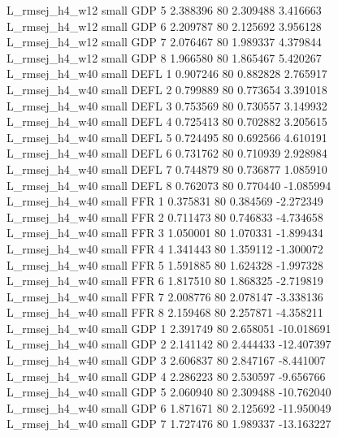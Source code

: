 L_rmsej_h4_w12      small      GDP                 5 2.388396 80       2.309488           3.416663
L_rmsej_h4_w12      small      GDP                 6 2.209787 80       2.125692           3.956128
L_rmsej_h4_w12      small      GDP                 7 2.076467 80       1.989337           4.379844
L_rmsej_h4_w12      small      GDP                 8 1.966580 80       1.865467           5.420267
L_rmsej_h4_w40      small     DEFL                 1 0.907246 80       0.882828           2.765917
L_rmsej_h4_w40      small     DEFL                 2 0.799889 80       0.773654           3.391018
L_rmsej_h4_w40      small     DEFL                 3 0.753569 80       0.730557           3.149932
L_rmsej_h4_w40      small     DEFL                 4 0.725413 80       0.702882           3.205615
L_rmsej_h4_w40      small     DEFL                 5 0.724495 80       0.692566           4.610191
L_rmsej_h4_w40      small     DEFL                 6 0.731762 80       0.710939           2.928984
L_rmsej_h4_w40      small     DEFL                 7 0.744879 80       0.736877           1.085910
L_rmsej_h4_w40      small     DEFL                 8 0.762073 80       0.770440          -1.085994
L_rmsej_h4_w40      small      FFR                 1 0.375831 80       0.384569          -2.272349
L_rmsej_h4_w40      small      FFR                 2 0.711473 80       0.746833          -4.734658
L_rmsej_h4_w40      small      FFR                 3 1.050001 80       1.070331          -1.899434
L_rmsej_h4_w40      small      FFR                 4 1.341443 80       1.359112          -1.300072
L_rmsej_h4_w40      small      FFR                 5 1.591885 80       1.624328          -1.997328
L_rmsej_h4_w40      small      FFR                 6 1.817510 80       1.868325          -2.719819
L_rmsej_h4_w40      small      FFR                 7 2.008776 80       2.078147          -3.338136
L_rmsej_h4_w40      small      FFR                 8 2.159468 80       2.257871          -4.358211
L_rmsej_h4_w40      small      GDP                 1 2.391749 80       2.658051         -10.018691
L_rmsej_h4_w40      small      GDP                 2 2.141142 80       2.444433         -12.407397
L_rmsej_h4_w40      small      GDP                 3 2.606837 80       2.847167          -8.441007
L_rmsej_h4_w40      small      GDP                 4 2.286223 80       2.530597          -9.656766
L_rmsej_h4_w40      small      GDP                 5 2.060940 80       2.309488         -10.762040
L_rmsej_h4_w40      small      GDP                 6 1.871671 80       2.125692         -11.950049
L_rmsej_h4_w40      small      GDP                 7 1.727476 80       1.989337         -13.163227
